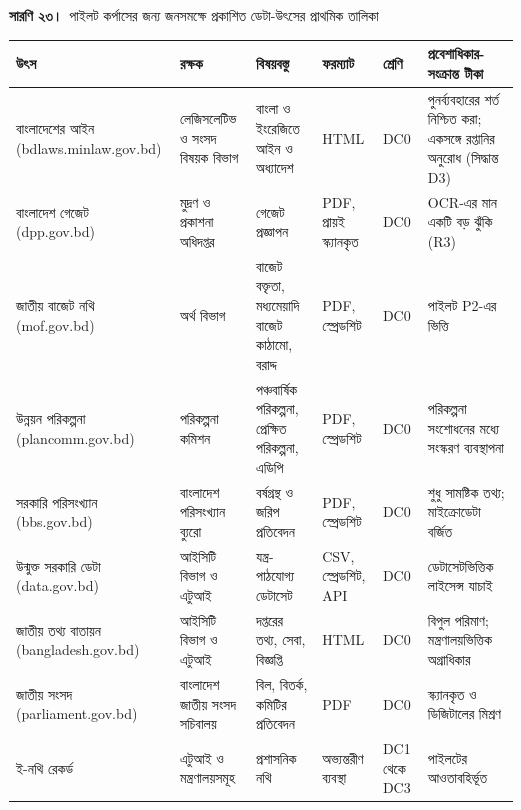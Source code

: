 \documentclass[border=10pt]{standalone}
\begin{document}
\begin{minipage}{22cm}
{\large\bfseries সারণি ২৩।}\ {\large পাইলট কর্পাসের জন্য জনসমক্ষে প্রকাশিত ডেটা-উৎসের প্রাথমিক তালিকা}\par\vspace{7pt}
\small
{}
\begin{tabularx}{\linewidth}{@{}>{\hsize=1.189\hsize\raggedright\arraybackslash}X>{\hsize=1.189\hsize\raggedright\arraybackslash}X>{\hsize=1.245\hsize\raggedright\arraybackslash}X>{\hsize=0.623\hsize\raggedright\arraybackslash}X>{\hsize=0.453\hsize\raggedright\arraybackslash}X>{\hsize=1.302\hsize\raggedright\arraybackslash}X@{}}
\arrayrulecolor{bapilrule}\toprule
\rowcolor{white}\textbf{উৎস} & \textbf{রক্ষক} & \textbf{বিষয়বস্তু} & \textbf{ফরম্যাট} & \textbf{শ্রেণি} & \textbf{প্রবেশাধিকার-সংক্রান্ত টীকা} \\
\midrule
বাংলাদেশের আইন (bdlaws.minlaw.gov.bd) & লেজিসলেটিভ ও সংসদ বিষয়ক বিভাগ & বাংলা ও ইংরেজিতে আইন ও অধ্যাদেশ & HTML & DC0 & পুনর্ব্যবহারের শর্ত নিশ্চিত করা; একসঙ্গে রপ্তানির অনুরোধ (সিদ্ধান্ত D3) \\
বাংলাদেশ গেজেট (dpp.gov.bd) & মুদ্রণ ও প্রকাশনা অধিদপ্তর & গেজেট প্রজ্ঞাপন & PDF, প্রায়ই স্ক্যানকৃত & DC0 & OCR-এর মান একটি বড় ঝুঁকি (R3) \\
জাতীয় বাজেট নথি (mof.gov.bd) & অর্থ বিভাগ & বাজেট বক্তৃতা, মধ্যমেয়াদি বাজেট কাঠামো, বরাদ্দ & PDF, স্প্রেডশিট & DC0 & পাইলট P2-এর ভিত্তি \\
উন্নয়ন পরিকল্পনা (plancomm.gov.bd) & পরিকল্পনা কমিশন & পঞ্চবার্ষিক পরিকল্পনা, প্রেক্ষিত পরিকল্পনা, এডিপি & PDF, স্প্রেডশিট & DC0 & পরিকল্পনা সংশোধনের মধ্যে সংস্করণ ব্যবস্থাপনা \\
সরকারি পরিসংখ্যান (bbs.gov.bd) & বাংলাদেশ পরিসংখ্যান ব্যুরো & বর্ষগ্রন্থ ও জরিপ প্রতিবেদন & PDF, স্প্রেডশিট & DC0 & শুধু সামষ্টিক তথ্য; মাইক্রোডেটা বর্জিত \\
উন্মুক্ত সরকারি ডেটা (data.gov.bd) & আইসিটি বিভাগ ও এটুআই & যন্ত্র-পাঠযোগ্য ডেটাসেট & CSV, স্প্রেডশিট, API & DC0 & ডেটাসেটভিত্তিক লাইসেন্স যাচাই \\
জাতীয় তথ্য বাতায়ন (bangladesh.gov.bd) & আইসিটি বিভাগ ও এটুআই & দপ্তরের তথ্য, সেবা, বিজ্ঞপ্তি & HTML & DC0 & বিপুল পরিমাণ; মন্ত্রণালয়ভিত্তিক অগ্রাধিকার \\
জাতীয় সংসদ (parliament.gov.bd) & বাংলাদেশ জাতীয় সংসদ সচিবালয় & বিল, বিতর্ক, কমিটির প্রতিবেদন & PDF & DC0 & স্ক্যানকৃত ও ডিজিটালের মিশ্রণ \\
ই-নথি রেকর্ড & এটুআই ও মন্ত্রণালয়সমূহ & প্রশাসনিক নথি & অভ্যন্তরীণ ব্যবস্থা & DC1 থেকে DC3 & পাইলটের আওতাবহির্ভূত \\

\end{tabularx}
\end{minipage}
\end{document}
